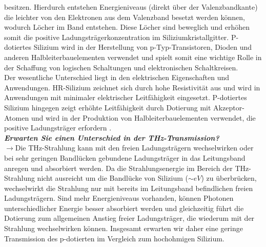 besitzen. Hierdurch entstehen Energieniveaus (direkt über der Valenzbandkante) 
die leichter von den Elektronen aus dem Valenzband besetzt werden können, wodurch Löcher im 
Band entstehen. Diese Löcher sind beweglich und erhöhen somit die positive 
Ladungsträgerkonzentration im Siliziumkristallgitter. 
P-dotiertes Silizium wird in der Herstellung von p-Typ-Transistoren, 
Dioden und anderen Halbleiterbauelementen verwendet und spielt somit 
eine wichtige Rolle in der Schaffung von logischen Schaltungen 
und elektronischen Schaltkreisen. \\
Der wesentliche Unterschied liegt in den elektrischen Eigenschaften und Anwendungen. 
HR-Silizium zeichnet sich durch hohe Resistivität aus und wird in Anwendungen mit minimaler 
elektrischer Leitfähigkeit eingesetzt. 
P-dotiertes Silizium hingegen zeigt erhöhte Leitfähigkeit durch Dotierung 
mit Akzeptor-Atomen und wird in der Produktion von Halbleiterbauelementen verwendet, 
die positive Ladungsträger erfordern \cite{Demtroder, EPC}. \\ 

\textbf{\textit{Erwarten Sie einen Unterschied in der THz-Transmission?}}\\
$\rightarrow$Die THz-Strahlung kann mit den freien Ladungsträgern wechselwirken oder
bei sehr geringen Bandlücken gebundene Ladungsträger in das Leitungsband anregen und absorbiert werden. 
Da die Strahlungsenergie im Bereich der THz-Strahlung nicht ausreicht um die 
Bandlücke von Silizium ($\sim \si{eV}$) zu überbrücken, wechselwirkt 
die Strahlung nur mit bereits im Leitungsband befindlichen freien Ladungsträgern.
Sind mehr Energieniveaus vorhanden, können Photonen unterschiedlicher Energie besser
absorbiert werden und gleichzeitig führt die Dotierung zum allgemeinen 
Anstieg freier Ladungsträger, die wiederum mit der Strahlung wechselwirken können.
Insgesamt erwarten wir daher eine geringe Transmission des p-dotierten im
Vergleich zum hochohmigen Silizium. 